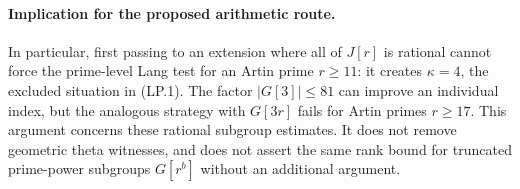 \paragraph{Implication for the proposed arithmetic route.}
In particular, first passing to an extension where all of
$J[r]$ is rational cannot force the prime-level Lang test
for an Artin prime $r\ge11$: it creates $\kappa=4$, the
excluded situation in (LP.1).
The factor $|G[3]|\le81$ can improve an individual index,
but the analogous strategy with $G[3r]$ fails for Artin
primes $r\ge17$.
This argument concerns these rational subgroup estimates.
It does not remove geometric theta witnesses, and does not
assert the same rank bound for truncated prime-power
subgroups $G[r^b]$ without an additional argument.
